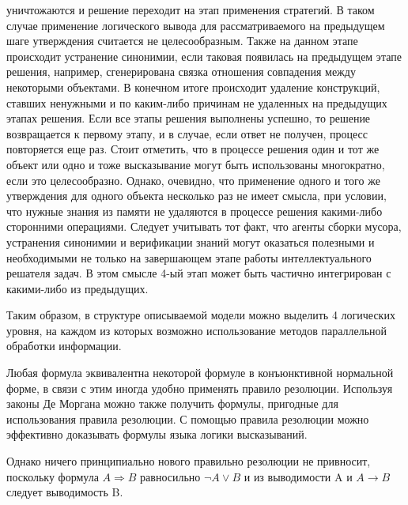 \begin{itemize}
{	уничтожаются и решение переходит на этап применения стратегий. В таком случае применение логического вывода для рассматриваемого на предыдущем шаге утверждения считается не	целесообразным. Также на данном этапе происходит устранение синонимии, если таковая появилась на предыдущем этапе решения,
	например, сгенерирована связка отношения совпадения между некоторыми объектами. В конечном итоге происходит удаление конструкций, ставших ненужными и по каким-либо причинам не удаленных на предыдущих этапах решения. Если все этапы решения выполнены успешно, то решение возвращается к первому этапу, и в случае, если ответ не получен, процесс повторяется еще раз. Стоит отметить, что в процессе решения один и тот же объект или одно и тоже высказывание могут быть использованы многократно, если это целесообразно. Однако, очевидно, что применение одного и того же утверждения для одного объекта несколько раз не имеет смысла, при условии, что нужные знания из памяти не удаляются в процессе решения какими-либо сторонними операциями. Следует учитывать тот факт, что агенты сборки мусора, устранения синонимии и верификации знаний могут оказаться полезными и необходимыми не только на завершающем этапе работы интеллектуального решателя задач. В этом смысле 4-ый этап может быть частично интегрирован с какими-либо из предыдущих.}
\end{itemize}

Таким образом, в структуре описываемой модели можно выделить 4 логических уровня, на каждом из которых возможно использование методов параллельной обработки информации. 

Любая формула эквивалентна некоторой формуле в конъюнктивной нормальной форме, в связи с этим иногда удобно применять правило резолюции. Используя законы Де Моргана можно также получить формулы, пригодные для использования правила резолюции.
С помощью правила резолюции можно эффективно доказывать формулы языка логики высказываний.

Однако ничего принципиально нового правильно резолюции не привносит, поскольку формула $A \Rightarrow B$  равносильно $\neg A \lor B$ и из выводимости A и $A \rightarrow B$ следует выводимость B.

